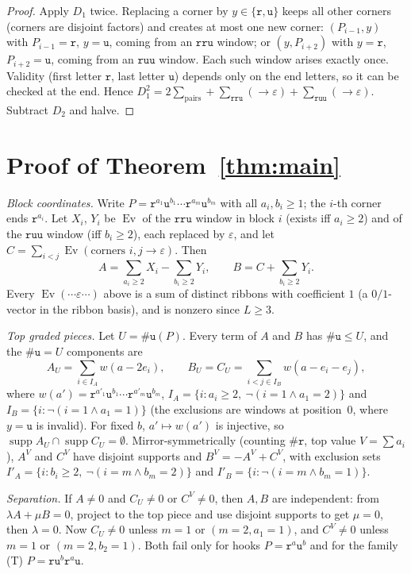 \documentclass[11pt]{amsart}
\newcommand{\Ev}{\operatorname{Ev}}
\newcommand{\tr}{\mathtt{r}}
\newcommand{\tu}{\mathtt{u}}
\newcommand{\te}{\varepsilon}
\newcommand{\supp}{\operatorname{supp}}
\theoremstyle{plain}
\theoremstyle{definition}
\begin{document}
\begin{proof}
Apply $D_1$ twice. Replacing a corner by $y\in\{\tr,\tu\}$ keeps all other corners (corners are disjoint factors) and creates at most one new corner: $(P_{i-1},y)$ with $P_{i-1}=\tr$, $y=\tu$, coming from an $\tr\tr\tu$ window; or $(y,P_{i+2})$ with $y=\tr$, $P_{i+2}=\tu$, coming from an $\tr\tu\tu$ window. Each such window arises exactly once. Validity (first letter $\tr$, last letter $\tu$) depends only on the end letters, so it can be checked at the end. Hence $D_1^2=2\sum_{\text{pairs}}+\sum_{\tr\tr\tu}(\to\te)+\sum_{\tr\tu\tu}(\to\te)$. Subtract $D_2$ and halve.
\end{proof}

\section{Proof of Theorem~\ref{thm:main}}
\emph{Block coordinates.} Write $P=\tr^{a_1}\tu^{b_1}\cdots\tr^{a_m}\tu^{b_m}$ with all $a_i,b_i\ge1$; the $i$-th corner ends $\tr^{a_i}$. Let $X_i$, $Y_i$ be $\Ev$ of the $\tr\tr\tu$ window in block $i$ (exists iff $a_i\ge2$) and of the $\tr\tu\tu$ window (iff $b_i\ge2$), each replaced by $\te$, and let $C=\sum_{i<j}\Ev(\text{corners }i,j\to\te)$. Then
\[
A=\sum_{a_i\ge2}X_i-\sum_{b_i\ge2}Y_i,\qquad B=C+\sum_{b_i\ge2}Y_i .
\]
Every $\Ev(\cdots\te\cdots)$ above is a sum of distinct ribbons with coefficient $1$ (a $0/1$-vector in the ribbon basis), and is nonzero since $L\ge3$.

\emph{Top graded pieces.} Let $U=\#\tu(P)$. Every term of $A$ and $B$ has $\#\tu\le U$, and the $\#\tu=U$ components are
\[
A_U=\sum_{i\in I_A}w(a-2e_i),\qquad B_U=C_U=\sum_{i<j\in I_B}w(a-e_i-e_j),
\]
where $w(a')=\tr^{a'_1}\tu^{b_1}\cdots\tr^{a'_m}\tu^{b_m}$, $I_A=\{i:a_i\ge2,\ \neg(i=1\wedge a_1=2)\}$ and $I_B=\{i:\neg(i=1\wedge a_1=1)\}$ (the exclusions are windows at position~$0$, where $y=\tu$ is invalid). For fixed $b$, $a'\mapsto w(a')$ is injective, so $\supp A_U\cap\supp C_U=\emptyset$. Mirror-symmetrically (counting $\#\tr$, top value $V=\sum a_i$), $A^V$ and $C^V$ have disjoint supports and $B^V=-A^V+C^V$, with exclusion sets $I'_A=\{i:b_i\ge2,\ \neg(i=m\wedge b_m=2)\}$ and $I'_B=\{i:\neg(i=m\wedge b_m=1)\}$.

\emph{Separation.} If $A\ne0$ and $C_U\ne0$ or $C^V\ne0$, then $A,B$ are independent: from $\lambda A+\mu B=0$, project to the top piece and use disjoint supports to get $\mu=0$, then $\lambda=0$. Now $C_U\ne0$ unless $m=1$ or $(m=2,a_1=1)$, and $C^V\ne0$ unless $m=1$ or $(m=2,b_2=1)$. Both fail only for hooks $P=\tr^a\tu^b$ and for the family (T) $P=\tr\tu^b\tr^a\tu$.
\end{document}

